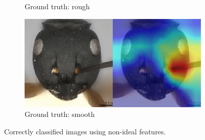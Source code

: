 \documentclass[12pt]{article}
\begin{document}
\begin{figure}
\begin{subfigure}{\subwidth}
        \caption{Ground truth: rough}
        \label{fig:correct_nonideal_1694}
    \end{subfigure}
    \begin{subfigure}{\subwidth}
        \includegraphics[width=1\linewidth]{assets/gradcam/correct_nonideal/388.png}
        \caption{Ground truth: smooth}
        \label{fig:correct_nonideal_388}
    \end{subfigure}
    \caption{Correctly classified images using non-ideal features.}
    \label{fig:correct_nonideal}
\end{figure}
\end{document}

